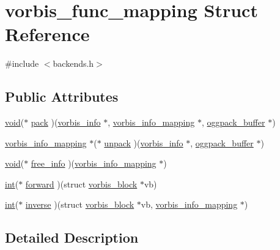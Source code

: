\hypertarget{structvorbis__func__mapping}{}\section{vorbis\+\_\+func\+\_\+mapping Struct Reference}
\label{structvorbis__func__mapping}


{\ttfamily \#include $<$backends.\+h$>$}

\subsection*{Public Attributes}
\begin{DoxyCompactItemize}
\item 
\hyperlink{sound_8c_ae35f5844602719cf66324f4de2a658b3}{void}($\ast$ \hyperlink{structvorbis__func__mapping_ac4f073ce01ba6cddc7710e08d2819b4f}{pack} )(\hyperlink{structvorbis__info}{vorbis\+\_\+info} $\ast$, \hyperlink{codec__internal_8h_ac950fba32fc1ede78f8bb7b83796969e}{vorbis\+\_\+info\+\_\+mapping} $\ast$, \hyperlink{structoggpack__buffer}{oggpack\+\_\+buffer} $\ast$)
\item 
\hyperlink{codec__internal_8h_ac950fba32fc1ede78f8bb7b83796969e}{vorbis\+\_\+info\+\_\+mapping} $\ast$($\ast$ \hyperlink{structvorbis__func__mapping_a1ca1a1d90d6bd107b904c1f1fac35d00}{unpack} )(\hyperlink{structvorbis__info}{vorbis\+\_\+info} $\ast$, \hyperlink{structoggpack__buffer}{oggpack\+\_\+buffer} $\ast$)
\item 
\hyperlink{sound_8c_ae35f5844602719cf66324f4de2a658b3}{void}($\ast$ \hyperlink{structvorbis__func__mapping_a47409f69c9d039bf13db26d7a514714d}{free\+\_\+info} )(\hyperlink{codec__internal_8h_ac950fba32fc1ede78f8bb7b83796969e}{vorbis\+\_\+info\+\_\+mapping} $\ast$)
\item 
\hyperlink{xmltok_8h_a5a0d4a5641ce434f1d23533f2b2e6653}{int}($\ast$ \hyperlink{structvorbis__func__mapping_aed216196d6bc64421e7b819ab1e11d5b}{forward} )(struct \hyperlink{structvorbis__block}{vorbis\+\_\+block} $\ast$vb)
\item 
\hyperlink{xmltok_8h_a5a0d4a5641ce434f1d23533f2b2e6653}{int}($\ast$ \hyperlink{structvorbis__func__mapping_a3ae479d11800da137af143b10d12487b}{inverse} )(struct \hyperlink{structvorbis__block}{vorbis\+\_\+block} $\ast$vb, \hyperlink{codec__internal_8h_ac950fba32fc1ede78f8bb7b83796969e}{vorbis\+\_\+info\+\_\+mapping} $\ast$)
\end{DoxyCompactItemize}


\subsection{Detailed Description}


